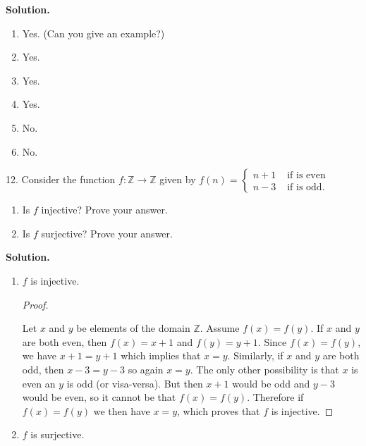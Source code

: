 \documentclass[10pt,]{book}
\theoremstyle{plain}
\theoremstyle{definition}
\theoremstyle{definition}
\theoremstyle{definition}
\def\Z{\mathbb Z}
\newcommand{\amp}{ & }
\begin{document}
\begin{exerciselist}
\par\smallskip
\par\smallskip
\noindent\textbf{Solution.}\hypertarget{solution-55}{}\quad
\leavevmode%
\begin{enumerate}[label=(\alph*)]
\item\hypertarget{li-351}{}
                Yes. (Can you give an example?)
\item\hypertarget{li-352}{}
                Yes.
\item\hypertarget{li-353}{}
                Yes.
\item\hypertarget{li-354}{}
                Yes.
\item\hypertarget{li-355}{}
                No.
\item\hypertarget{li-356}{}
                No.
\end{enumerate}
\item[12.]\hypertarget{exercise-38}{}
            Consider the function \(f:\Z \to \Z\) given by \(f(n) = \begin{cases}n+1 \amp  \mbox{ if  is even} \\ n-3 \amp \mbox{ if  is odd} . \end{cases}
            \)
\leavevmode%
\begin{enumerate}[label=(\alph*)]
\item\hypertarget{li-357}{}
                Is \(f\) injective? Prove your answer.
\item\hypertarget{li-358}{}
                Is \(f\) surjective? Prove your answer.
\end{enumerate}
\par\smallskip
\par\smallskip
\noindent\textbf{Solution.}\hypertarget{solution-56}{}\quad
\leavevmode%
\begin{enumerate}[label=(\alph*)]
\item\hypertarget{li-359}{}\(f\) is injective.

              \begin{proof}\hypertarget{proof-1}{}

                  Let \(x\) and \(y\) be elements of the domain \(\Z\). Assume \(f(x) = f(y)\). If \(x\) and \(y\) are both even, then \(f(x) = x+1\) and \(f(y) = y+1\). Since \(f(x) = f(y)\), we have \(x + 1 = y + 1\) which implies that \(x = y\). Similarly, if \(x\) and \(y\) are both odd, then \(x - 3 = y-3\) so again \(x = y\). The only other possibility is that \(x\) is even an \(y\) is odd (or visa-versa). But then \(x + 1\) would be odd and \(y - 3\) would be even, so it cannot be that \(f(x) = f(y)\). Therefore if \(f(x) = f(y)\) we then have \(x = y\), which proves that \(f\) is injective.
\end{proof}
\item\hypertarget{li-360}{}\(f\) is surjective.


\end{enumerate}
\end{exerciselist}
\end{document}
